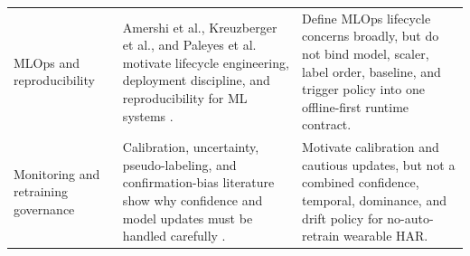 \begin{table}[htbp]
\begin{tabularx}{\textwidth}{p{3.0cm} X X}
MLOps and reproducibility
& Amershi et al., Kreuzberger et al., and Paleyes et al. motivate lifecycle engineering, deployment discipline, and reproducibility for ML systems \cite{amershi2019mlops,kreuzberger2023mlops,paleyes2022challenges}.
& Define MLOps lifecycle concerns broadly, but do not bind model, scaler, label order, baseline, and trigger policy into one offline-first runtime contract. \\

Monitoring and retraining governance
& Calibration, uncertainty, pseudo-labeling, and confirmation-bias literature show why confidence and model updates must be handled carefully \cite{guo2017calibration,gal2016dropout,lee2013pseudolabel,arazo2020pseudolabel}.
& Motivate calibration and cautious updates, but not a combined confidence, temporal, dominance, and drift policy for no-auto-retrain wearable HAR. \\

\bottomrule
\end{tabularx}
\end{table}
\renewcommand{\arraystretch}{1.0}
